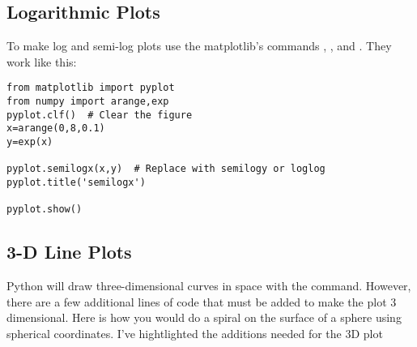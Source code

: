 \subsection*{Logarithmic Plots}
  To make log and
semi-log plots use the matplotlib's commands , , and
. They work like this:
\begin{Verbatim}
from matplotlib import pyplot
from numpy import arange,exp
pyplot.clf()  # Clear the figure
x=arange(0,8,0.1)
y=exp(x)

pyplot.semilogx(x,y)  # Replace with semilogy or loglog
pyplot.title('semilogx')

pyplot.show()
\end{Verbatim}

\subsection*{3-D Line Plots}
   Python will
draw three-dimensional curves in space with the  command.
However, there are a few additional lines of code that must be added
to make the plot 3 dimensional.  Here is how you would do a spiral on
the surface of a sphere using spherical coordinates.  I've
hightlighted the additions needed for the 3D plot
